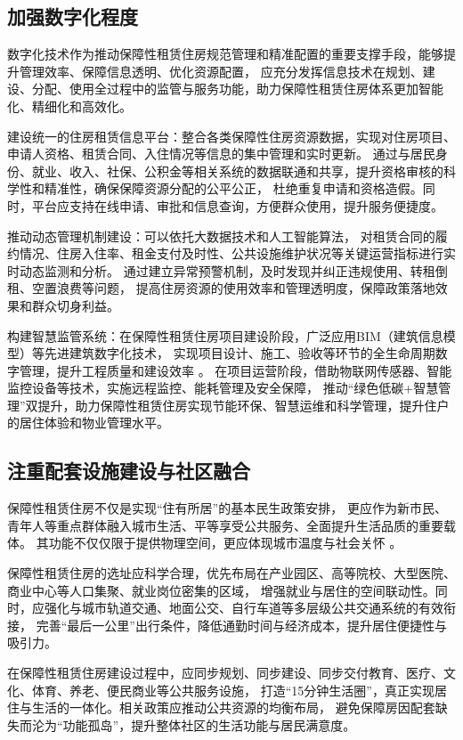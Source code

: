 \subsection{加强数字化程度}
数字化技术作为推动保障性租赁住房规范管理和精准配置的重要支撑手段，能够提升管理效率、保障信息透明、优化资源配置，
应充分发挥信息技术在规划、建设、分配、使用全过程中的监管与服务功能，助力保障性租赁住房体系更加智能化、精细化和高效化。

建设统一的住房租赁信息平台：整合各类保障性住房资源数据，实现对住房项目、申请人资格、租赁合同、入住情况等信息的集中管理和实时更新。
通过与居民身份、就业、收入、社保、公积金等相关系统的数据联通和共享，提升资格审核的科学性和精准性，确保保障资源分配的公平公正，
杜绝重复申请和资格造假。同时，平台应支持在线申请、审批和信息查询，方便群众使用，提升服务便捷度。

推动动态管理机制建设：可以依托大数据技术和人工智能算法，
对租赁合同的履约情况、住房入住率、租金支付及时性、公共设施维护状况等关键运营指标进行实时动态监测和分析。
通过建立异常预警机制，及时发现并纠正违规使用、转租倒租、空置浪费等问题，
提高住房资源的使用效率和管理透明度，保障政策落地效果和群众切身利益。

构建智慧监管系统：在保障性租赁住房项目建设阶段，广泛应用BIM（建筑信息模型）等先进建筑数字化技术，
实现项目设计、施工、验收等环节的全生命周期数字管理，提升工程质量和建设效率 \cite{RN10}。
在项目运营阶段，借助物联网传感器、智能监控设备等技术，实施远程监控、能耗管理及安全保障，
推动“绿色低碳+智慧管理”双提升，助力保障性租赁住房实现节能环保、智慧运维和科学管理，提升住户的居住体验和物业管理水平。

\subsection{注重配套设施建设与社区融合}
保障性租赁住房不仅是实现“住有所居”的基本民生政策安排，
更应作为新市民、青年人等重点群体融入城市生活、平等享受公共服务、全面提升生活品质的重要载体。
其功能不仅仅限于提供物理空间，更应体现城市温度与社会关怀 \cite{RN11} \cite{RN12}。

保障性租赁住房的选址应科学合理，优先布局在产业园区、高等院校、大型医院、商业中心等人口集聚、就业岗位密集的区域，
增强就业与居住的空间联动性。同时，应强化与城市轨道交通、地面公交、自行车道等多层级公共交通系统的有效衔接，
完善“最后一公里”出行条件，降低通勤时间与经济成本，提升居住便捷性与吸引力。

在保障性租赁住房建设过程中，应同步规划、同步建设、同步交付教育、医疗、文化、体育、养老、便民商业等公共服务设施，
打造“15分钟生活圈”，真正实现居住与生活的一体化。相关政策应推动公共资源的均衡布局，
避免保障房因配套缺失而沦为“功能孤岛”，提升整体社区的生活功能与居民满意度。
